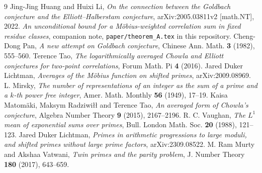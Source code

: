 \documentclass[11pt,a4paper]{article}
\theoremstyle{plain}
\theoremstyle{definition}
\begin{document}
\begin{thebibliography}{9}
 Jing-Jing Huang and Huixi Li, \emph{On the connection
between the Goldbach conjecture and the Elliott--Halberstam
conjecture}, arXiv:2005.03811v2 [math.NT], 2022.
 \emph{An unconditional bound for a M\"obius-weighted
correlation sum in fixed residue classes}, companion note,
\texttt{paper/theorem\_A.tex} in this repository.
 Cheng-Dong Pan, \emph{A new attempt on Goldbach
conjecture}, Chinese Ann. Math. \textbf{3} (1982), 555--560.
 Terence Tao, \emph{The logarithmically averaged Chowla
and Elliott conjectures for two-point correlations}, Forum Math. Pi
\textbf{4} (2016).
 Jared Duker Lichtman, \emph{Averages of the M\"obius
function on shifted primes}, arXiv:2009.08969.
 L. Mirsky, \emph{The number of representations
of an integer as the sum of a prime and a $k$-th power free
integer}, Amer. Math. Monthly \textbf{56} (1949), 17--19.
 Kaisa Matom\"aki, Maksym Radziwi\l{}\l{}
and Terence Tao, \emph{An averaged form of Chowla's conjecture},
Algebra Number Theory \textbf{9} (2015), 2167--2196.
 R. C. Vaughan, \emph{The $L^1$ mean of exponential
sums over primes}, Bull. London Math. Soc. \textbf{20} (1988),
121--123.
 Jared Duker Lichtman, \emph{Primes in arithmetic
progressions to large moduli, and shifted primes without large prime
factors}, arXiv:2309.08522.
 M. Ram Murty and Akshaa Vatwani, \emph{Twin primes and
the parity problem}, J. Number Theory \textbf{180} (2017), 643--659.
\end{thebibliography}
\end{document}
